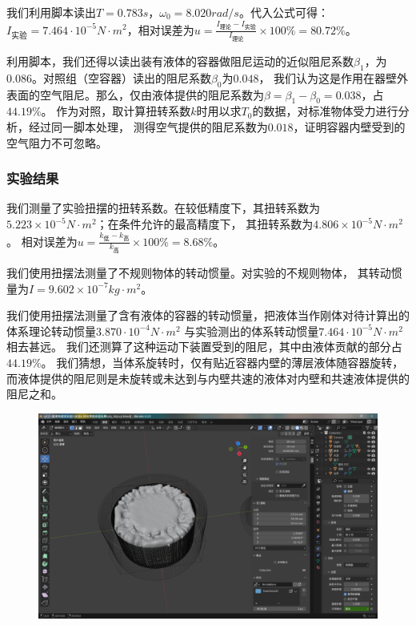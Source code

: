 \documentclass[12pt,hyperref,a4paper,UTF8]{ctexart}
\begin{document}
我们利用脚本读出$T = 0.783s$，$\omega_0 = 8.020rad/s$。代入公式可得：
$ I_{实验} = 7.464·10^{-5} N·m^2 $，相对误差为$ u = \frac{I_{理论} - I_{实验}}{I_{理论}} \times 100\% = 80.72\% $。

利用脚本，我们还得以读出装有液体的容器做阻尼运动的近似阻尼系数$\beta_1$，为$0.086$。对照组（空容器）读出的阻尼系数$\beta_0$为$0.048$，
我们认为这是作用在器壁外表面的空气阻尼。那么，仅由液体提供的阻尼系数为$ \beta = \beta_1 - \beta_0 = 0.038 $，占$44.19\%$。
作为对照，取计算扭转系数$k$时用以求$T_0$的数据，对标准物体受力进行分析，经过同一脚本处理，
测得空气提供的阻尼系数为$0.018$，证明容器内壁受到的空气阻力不可忽略。

\subsubsection{实验结果}

我们测量了实验扭摆的扭转系数。在较低精度下，其扭转系数为$5.223 \times 10^{-5} N·m^2$；在条件允许的最高精度下，
其扭转系数为$4.806 \times 10^{-5} N·m^2$。
相对误差为$ u = \frac{k_{低} - k_{高}}{k_{高}} \times 100\% = 8.68\% $。

我们使用扭摆法测量了不规则物体的转动惯量。对实验的不规则物体，
其转动惯量为$ I = 9.602 \times 10^{-7} kg·m^2 $。

我们使用扭摆法测量了含有液体的容器的转动惯量，把液体当作刚体对待计算出的体系理论转动惯量$3.870·10^{-4} N·m^2$
与实验测出的体系转动惯量$7.464·10^{-5} N·m^2$相去甚远。
我们还测算了这种运动下装置受到的阻尼，其中由液体贡献的部分占$44.19\%$。
我们猜想，当体系旋转时，仅有贴近容器内壁的薄层液体随容器旋转，
而液体提供的阻尼则是未旋转或未达到与内壁共速的液体对内壁和共速液体提供的阻尼之和。

\begin{figure}[htbp]
    \centering
    \includegraphics[scale=0.25]{blender.eps}
    \caption{}
\end{figure}
\end{document}
